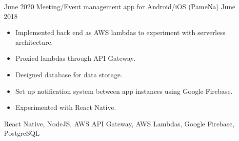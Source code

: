 %
%
%

  \begin{experiences}
    \personal
      {June 2020}
      {Meeting/Event management app for Android/iOS (PameNa)}
      {June 2018}
      {
        \begin{itemize}
          \item Implemented back end as AWS lambdas to experiment with serverless architecture.
          \item Proxied lambdas through API Gateway.
          \item Designed database for data storage.
          \item Set up notification system between app instances using Google Firebase.
          \item Experimented with React Native.
        \end{itemize}
      }
      {React Native, NodeJS, AWS API Gateway, AWS Lambdas, Google Firebase, PostgreSQL}
      {}
  \end{experiences}

